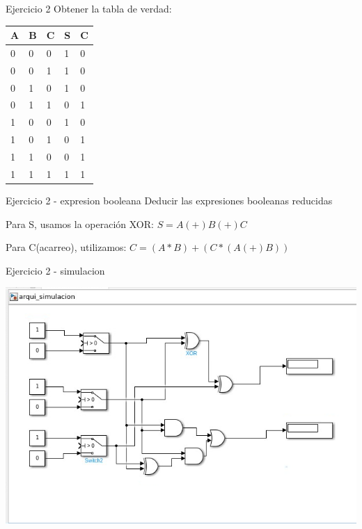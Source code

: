 \documentclass[presentation]{beamer}
\begin{document}
\begin{frame}[label={sec:org3d2a8b7}]{Ejercicio 2}
Obtener la tabla de verdad:
\begin{center}
\begin{tabular}{|l|l|l|l|l|}
\hline
A & B & C & S & C \\
\hline
0 & 0 & 0 & 1 & 0 \\
\hline
0 & 0 & 1 & 1 & 0 \\
\hline
0 & 1 & 0 & 1 & 0 \\
\hline
0 & 1 & 1 & 0 & 1 \\
\hline
1 & 0 & 0 & 1 & 0 \\
\hline
1 & 0 & 1 & 0 & 1 \\
\hline
1 & 1 & 0 & 0 & 1 \\
\hline
1 & 1 & 1 & 1 & 1 \\
\hline
\end{tabular}
\end{center}
\end{frame}

\begin{frame}[label={sec:org0fdba76}]{Ejercicio 2 - expresion booleana}
Deducir las expresiones booleanas reducidas

Para S, usamos la operación XOR:
\(S = A(+)B(+)C\)

Para C(acarreo), utilizamos:
\(C = (A*B) + ( C*(A(+)B) )\)
\end{frame}

\begin{frame}[label={sec:orga1dc57d}]{Ejercicio 2 - simulacion}
\begin{center}
\includegraphics[width=.9\linewidth]{./ejercicio2_simulacion.png}
\end{center}
\end{frame}
\end{document}
